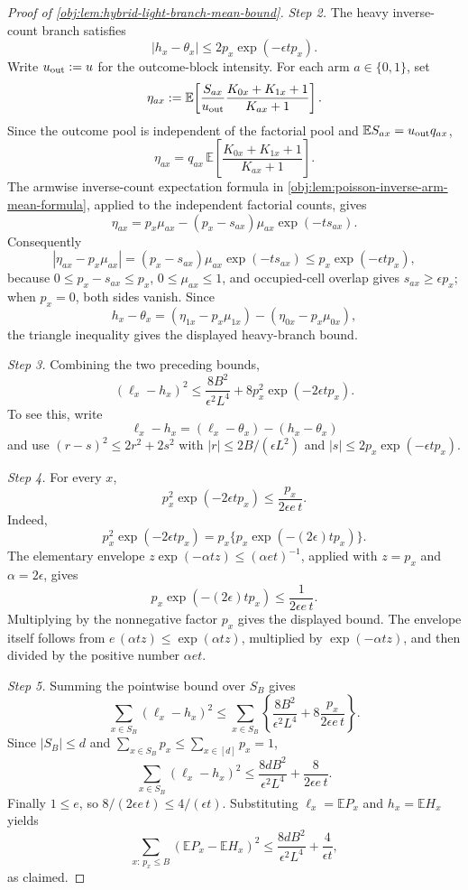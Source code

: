 \begin{proof}[Proof of \cref{obj:lem:hybrid-light-branch-mean-bound}]
\emph{Step 2.} The heavy inverse-count branch satisfies
\[
|h_x-\theta_x|
\le
2p_x\exp(-\epsilon t p_x).
\]
Write \(u_{\rm out}:=u\) for the outcome-block intensity.  For each arm
\(a\in\{0,1\}\), set
\[
\eta_{ax}:=
\mathbb E\!\left[
\frac{S_{ax}}{u_{\rm out}}\frac{K_{0x}+K_{1x}+1}{K_{ax}+1}
\right].
\]
Since the outcome pool is independent of the factorial pool and
\(\mathbb E S_{ax}=u_{\rm out}q_{ax}\),
\[
\eta_{ax}
=
q_{ax}\,
\mathbb E\!\left[\frac{K_{0x}+K_{1x}+1}{K_{ax}+1}\right].
\]
The armwise inverse-count expectation formula in
\cref{obj:lem:poisson-inverse-arm-mean-formula}, applied to the independent factorial counts,
gives
\[
\eta_{ax}
=
p_x\mu_{ax}-(p_x-s_{ax})\mu_{ax}\exp(-t s_{ax}).
\]
Consequently
\[
|\eta_{ax}-p_x\mu_{ax}|
=
(p_x-s_{ax})\mu_{ax}\exp(-t s_{ax})
\le
p_x\exp(-\epsilon t p_x),
\]
because \(0\le p_x-s_{ax}\le p_x\), \(0\le\mu_{ax}\le1\), and occupied-cell overlap gives
\(s_{ax}\ge\epsilon p_x\); when \(p_x=0\), both sides vanish. Since
\[
h_x-\theta_x=(\eta_{1x}-p_x\mu_{1x})-(\eta_{0x}-p_x\mu_{0x}),
\]
the triangle inequality gives the displayed heavy-branch bound. %

\emph{Step 3.} Combining the two preceding bounds,
\[
(\ell_x-h_x)^2
\le
\frac{8B^2}{\epsilon^2L^4}
+
8p_x^2\exp(-2\epsilon t p_x).
\]
To see this, write
\[
\ell_x-h_x=(\ell_x-\theta_x)-(h_x-\theta_x)
\]
and use \((r-s)^2\le 2r^2+2s^2\) with
\(|r|\le 2B/(\epsilon L^2)\) and
\(|s|\le 2p_x\exp(-\epsilon t p_x)\). %

\emph{Step 4.} For every \(x\),
\[
p_x^2\exp(-2\epsilon t p_x)
\le
\frac{p_x}{2\epsilon e\,t}.
\]
Indeed,
\[
p_x^2\exp(-2\epsilon t p_x)
=
p_x\{p_x\exp(-(2\epsilon)t p_x)\}.
\]
The elementary envelope \(z\exp(-\alpha t z)\le(\alpha e t)^{-1}\), applied with
\(z=p_x\) and \(\alpha=2\epsilon\), gives
\[
p_x\exp(-(2\epsilon)t p_x)\le \frac{1}{2\epsilon e\,t}.
\]
Multiplying by the nonnegative factor \(p_x\) gives the displayed bound. The envelope itself follows from
\(e\,(\alpha t z)\le \exp(\alpha t z)\), multiplied by
\(\exp(-\alpha t z)\), and then divided by the positive number \(\alpha e t\). %

\emph{Step 5.} Summing the pointwise bound over \(S_B\) gives
\[
\sum_{x\in S_B}(\ell_x-h_x)^2
\le
\sum_{x\in S_B}
\left\{
\frac{8B^2}{\epsilon^2L^4}
+
8\frac{p_x}{2\epsilon e\,t}
\right\}.
\]
Since \(|S_B|\le d\) and \(\sum_{x\in S_B}p_x\le\sum_{x\in[d]}p_x=1\),
\[
\sum_{x\in S_B}(\ell_x-h_x)^2
\le
\frac{8dB^2}{\epsilon^2L^4}
+
\frac{8}{2\epsilon e\,t}.
\]
Finally \(1\le e\), so \(8/(2\epsilon e\,t)\le 4/(\epsilon t)\). Substituting
\(\ell_x=\mathbb E P_x\) and \(h_x=\mathbb E H_x\) yields
\[
\sum_{x:\,p_x\le B}
\left(\mathbb E P_x-\mathbb E H_x\right)^2
\le
\frac{8dB^2}{\epsilon^2L^4}
+
\frac{4}{\epsilon t},
\]
as claimed. %
\end{proof}
